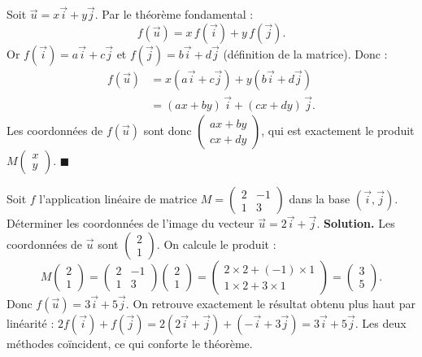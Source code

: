 \documentclass[11pt]{article}
\begin{document}
\begin{experience}
Soit $\vec{u} = x\vec{i}+y\vec{j}$. Par le théorème fondamental :
\[ f(\vec{u}) = x\,f(\vec{i}) + y\,f(\vec{j}). \]
Or $f(\vec{i}) = a\vec{i}+c\vec{j}$ et $f(\vec{j}) = b\vec{i}+d\vec{j}$ (définition de la matrice). Donc :
\begin{align*}
f(\vec{u}) &= x(a\vec{i}+c\vec{j}) + y(b\vec{i}+d\vec{j}) \\
&= (ax+by)\,\vec{i} + (cx+dy)\,\vec{j}.
\end{align*}
Les coordonnées de $f(\vec{u})$ sont donc $\begin{pmatrix} ax+by \\ cx+dy \end{pmatrix}$, qui est exactement le produit $M\begin{pmatrix} x \\ y \end{pmatrix}$. $\blacksquare$
\end{experience}

\begin{exoresolu}
Soit $f$ l'application linéaire de matrice $M = \begin{pmatrix} 2 & -1 \\ 1 & 3 \end{pmatrix}$ dans la base $(\vec{i},\vec{j})$. Déterminer les coordonnées de l'image du vecteur $\vec{u} = 2\vec{i}+\vec{j}$.
\tcblower
\textbf{Solution.} Les coordonnées de $\vec{u}$ sont $\begin{pmatrix} 2 \\ 1 \end{pmatrix}$. On calcule le produit :
\[ M\begin{pmatrix} 2 \\ 1 \end{pmatrix} = \begin{pmatrix} 2 & -1 \\ 1 & 3 \end{pmatrix}\begin{pmatrix} 2 \\ 1 \end{pmatrix} = \begin{pmatrix} 2\times 2 + (-1)\times 1 \\ 1\times 2 + 3\times 1 \end{pmatrix} = \begin{pmatrix} 3 \\ 5 \end{pmatrix}. \]
Donc $f(\vec{u}) = 3\vec{i}+5\vec{j}$. On retrouve exactement le résultat obtenu plus haut par linéarité : $2f(\vec{i})+f(\vec{j}) = 2(2\vec{i}+\vec{j})+(-\vec{i}+3\vec{j}) = 3\vec{i}+5\vec{j}$. Les deux méthodes coïncident, ce qui conforte le théorème.
\end{exoresolu}
\end{document}
